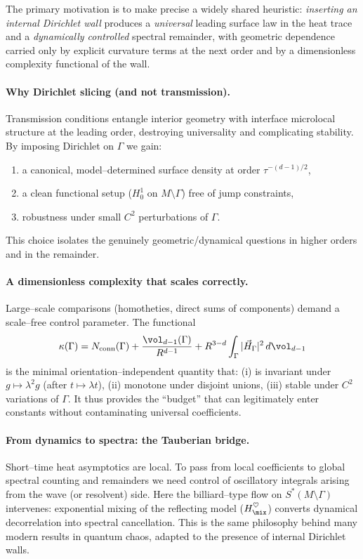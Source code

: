 The primary motivation is to make precise a widely shared heuristic:
\emph{inserting an internal Dirichlet wall} produces a \emph{universal} leading
surface law in the heat trace and a \emph{dynamically controlled} spectral remainder,
with geometric dependence carried only by explicit curvature terms at the next order
and by a dimensionless complexity functional of the wall.

\paragraph{Why Dirichlet slicing (and not transmission).}
Transmission conditions entangle interior geometry with interface microlocal structure at the leading order, destroying universality and complicating stability.
By imposing Dirichlet on $\Gamma$ we gain:
\begin{enumerate}
  \item a canonical, model–determined surface density at order $\tau^{-(d-1)/2}$,
  \item a clean functional setup ($H^1_0$ on $M\setminus\Gamma$) free of jump constraints,
  \item robustness under small $C^2$ perturbations of $\Gamma$.
\end{enumerate}
This choice isolates the genuinely geometric/dynamical questions in higher orders and in the remainder.

\paragraph{A dimensionless complexity that scales correctly.}
Large–scale comparisons (homotheties, direct sums of components) demand a scale–free control parameter. The functional
\[
\kappa(\Gamma)
= N_{\mathrm{conn}}(\Gamma)
+ \frac{\vol_{d-1}(\Gamma)}{R^{d-1}}
+ R^{3-d}\int_\Gamma |\vec H_\Gamma|^2\,d\vol_{d-1}
\]
is the minimal orientation–independent quantity that:
(i) is invariant under $g\mapsto\lambda^2 g$ (after $t\mapsto\lambda t$),
(ii) monotone under disjoint unions,
(iii) stable under $C^2$ variations of $\Gamma$.
It thus provides the “budget” that can legitimately enter constants without contaminating universal coefficients.

\paragraph{From dynamics to spectra: the Tauberian bridge.}
Short–time heat asymptotics are local. To pass from local coefficients to global spectral counting and remainders we need control of oscillatory integrals arising from the wave (or resolvent) side. Here the billiard–type flow on $S^*(M\setminus\Gamma)$ intervenes: exponential mixing of the reflecting model ($H_{\mix}^\heartsuit$) converts dynamical decorrelation into spectral cancellation. This is the same philosophy behind many modern results in quantum chaos, adapted to the presence of internal Dirichlet walls.

